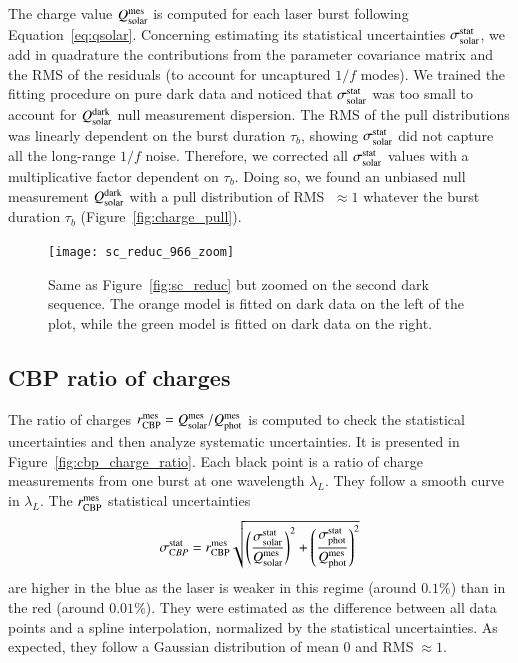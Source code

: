 The charge value $Q_{\mathrm{solar}}^{\mathrm{mes}}$ is computed for each laser burst following Equation~\ref{eq:qsolar}. Concerning estimating its statistical uncertainties $\sigma_{\mathrm{solar}}^{\mathrm{stat}}$, we add in quadrature the contributions from the parameter covariance matrix and the RMS of the residuals (to account for uncaptured $1/f$ modes). We trained the fitting procedure on pure dark data and noticed that $\sigma_{\mathrm{solar}}^{\mathrm{stat}}$ was too small to account for $Q_{\mathrm{solar}}^{\rm dark}$ null measurement dispersion. The RMS of the pull distributions was linearly dependent on the burst duration $\tau_b$, showing $\sigma_{\mathrm{solar}}^{\mathrm{stat}}$ did not capture all the long-range $1/f$ noise. Therefore, we corrected all $\sigma_{\mathrm{solar}}^{\mathrm{stat}}$ values with a multiplicative factor dependent on $\tau_b$. Doing so, we found an unbiased null measurement $Q_{\mathrm{solar}}^{\rm dark}$ with a pull distribution of RMS $\;\approx 1$ whatever the burst duration $\tau_b$ (Figure~\ref{fig:charge_pull}). 

\begin{figure}[!h]
\centering
\texttt{[image: sc\_reduc\_966\_zoom]}
\caption{Same as Figure~\ref{fig:sc_reduc} but zoomed on the second dark sequence. The orange model is fitted on dark data on the left of the plot, while the green model is fitted on dark data on the right.}\label{fig:sc_reduc_zoom}
\end{figure}


\subsection{CBP ratio of charges}

The ratio of charges $r_{\rm CBP}^{\rm mes} = Q_{\mathrm{solar}}^{\mathrm{mes}}/Q_{\mathrm{phot}}^{\mathrm{mes}}$ is computed to check the statistical uncertainties and then analyze systematic uncertainties. It is presented in Figure~\ref{fig:cbp_charge_ratio}. Each black point is a ratio of charge measurements from one burst at one wavelength $\lambda_L$. They follow a smooth curve in $\lambda_L$. The $r_{\rm CBP}^{\rm mes}$ statistical uncertainties 
\begin{equation}
    \sigma_{\mathrm CBP}^{\rm stat} = r_{\rm CBP}^{\rm mes} \sqrt{\left(\frac{\sigma_{\mathrm{solar}}^{\mathrm{stat}}}{Q_{\mathrm{solar}}^{\mathrm{mes}}}\right)^2 +  \left(\frac{\sigma_{\mathrm{phot}}^{\mathrm{stat}}}{Q_{\mathrm{phot}}^{\mathrm{mes}}}\right)^2 }
\end{equation}
are higher in the blue as the laser is weaker in this regime (around $0.1\%$) than in the red (around $0.01\%$). They were estimated as the difference between all data points and a spline interpolation, normalized by the statistical uncertainties. As expected, they follow a Gaussian distribution of mean 0 and RMS$\;\approx 1$. 

